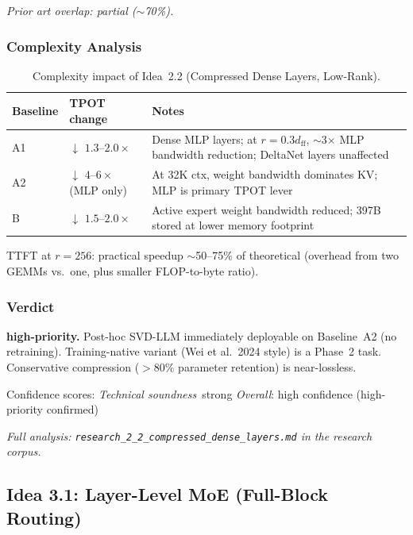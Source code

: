 \documentclass[11pt]{article}
\begin{document}
\noindent
\emph{Prior art overlap: partial ($\sim$70\%).}

\subsubsection*{Complexity Analysis}

\begin{table}[h]
\centering
\caption{Complexity impact of Idea~2.2 (Compressed Dense Layers, Low-Rank).}
\label{tab:complexity-2-2}
\begin{tabular}{llp{7cm}}
\toprule
\textbf{Baseline} & \textbf{TPOT change} & \textbf{Notes} \\
\midrule
A1 & $\downarrow$ $1.3$--$2.0\times$ & Dense MLP layers; at $r=0.3 d_\text{ff}$, $\sim$3$\times$ MLP bandwidth reduction; DeltaNet layers unaffected \\
A2 & $\downarrow$ $4$--$6\times$ (MLP only) & At 32K ctx, weight bandwidth dominates KV; MLP is primary TPOT lever \\
B  & $\downarrow$ $1.5$--$2.0\times$ & Active expert weight bandwidth reduced; 397B stored at lower memory footprint \\
\bottomrule
\end{tabular}
\end{table}

\noindent
TTFT at $r=256$: practical speedup $\sim$50--75\% of theoretical (overhead from two GEMMs vs.\ one, plus smaller FLOP-to-byte ratio).

\subsubsection*{Verdict}
\textbf{high-priority.}
Post-hoc SVD-LLM immediately deployable on Baseline~A2 (no retraining).
Training-native variant (Wei et al.\ 2024 style) is a Phase~2 task.
Conservative compression ($>$80\% parameter retention) is near-lossless.

\noindent
Confidence scores:
\emph{Technical soundness}~strong \quad
\emph{Overall}: high confidence (high-priority confirmed)
\par\noindent\textit{Full analysis: \texttt{research\_2\_2\_compressed\_dense\_layers.md} in the research corpus.}


\subsection{Idea 3.1: Layer-Level MoE (Full-Block Routing)}
\label{subsec:idea-3-1}
\end{document}
